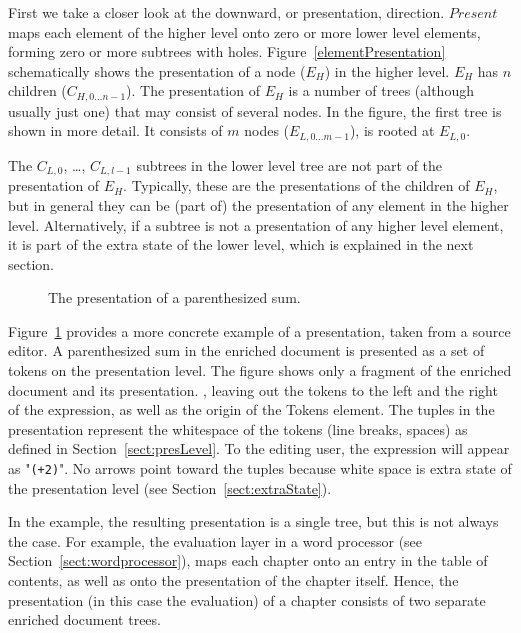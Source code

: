 First we take a closer look at the downward, or presentation, direction. $Present$ maps each element of the higher level onto zero or more lower level elements, forming zero or more subtrees with holes.  Figure~\ref{elementPresentation} schematically shows the presentation of a node ($E_H$) in the higher level. $E_H$ has $n$ children ($C_{H,0\dots n-1}$). The presentation of $E_H$ is a number of trees (although usually just one) that may consist of several nodes. In the figure, the first tree is shown in more detail. It consists of $m$ nodes ($E_{L,0\dots m-1}$), is rooted at $E_{L,0}$. 

The $C_{L,0}$, \dots, $C_{L,l-1}$ subtrees in the lower level tree are not part of the presentation of $E_H$. Typically, these are the presentations of the children of $E_H$, but in general they can be (part of) the presentation of any element in the higher level. Alternatively, if a subtree is not a presentation of any higher level element, it is part of the extra state of the lower level, which is explained in the next section.

\begin{figure}
\begin{center}
\begin{center}
%
%
\end{center}
\caption{The presentation of a parenthesized sum.}\label{presentExample} 
\end{center}
\end{figure}

Figure~\ref{presentExample} provides a more concrete example of a presentation, taken from a source editor. A parenthesized sum in the enriched document is presented as a set of tokens on the presentation level. The figure shows only a fragment of the enriched document and its presentation. \bc , leaving out the tokens to the left and the right of the expression, as well as the origin of the Tokens element. \ec The tuples in the presentation represent the whitespace of the tokens (line breaks, spaces) as defined in Section~\ref{sect:presLevel}. To the editing user, the expression will appear as "{\tt (+2\textvisiblespace )}". No arrows point toward the tuples because white space is extra state of the presentation level (see Section~\ref{sect:extraState}). 

\bc
In the example, the resulting presentation is a single tree, but this is not always the case. For example, the evaluation layer in a word processor (see Section~\ref{sect:wordprocessor}), maps each chapter onto an entry in the table of contents, as well as onto the presentation of the chapter itself. Hence, the presentation (in this case the evaluation) of a chapter consists of two separate enriched document trees.
\ec




